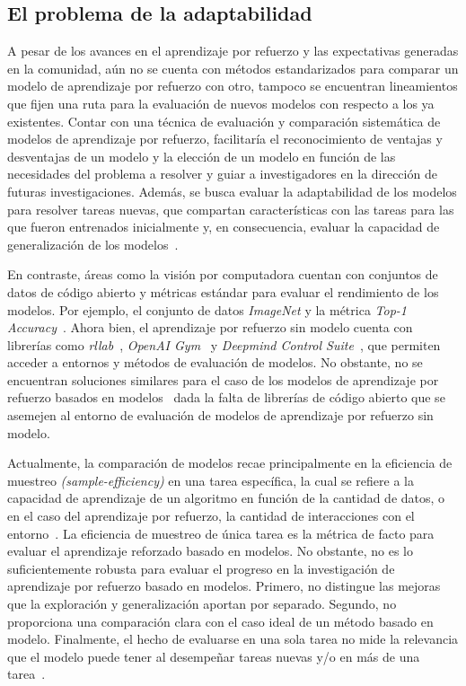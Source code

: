 \subsection{El problema de la adaptabilidad}\label{subsec:el-problema-de-la-adaptabilidad}
A pesar de los avances en el aprendizaje por refuerzo y las expectativas generadas en la comunidad, aún no se cuenta con métodos estandarizados para comparar un modelo de aprendizaje por refuerzo con otro, tampoco se encuentran lineamientos que fijen una ruta para la evaluación de nuevos modelos con respecto a los ya existentes.
Contar con una técnica de evaluación y comparación sistemática de modelos de aprendizaje por refuerzo, facilitaría el reconocimiento de ventajas y desventajas de un modelo y la elección de un modelo en función de las necesidades del problema a resolver y guiar a investigadores en la dirección de futuras investigaciones.
Además, se busca evaluar la adaptabilidad de los modelos para resolver tareas nuevas, que compartan características con las tareas para las que fueron entrenados inicialmente y, en consecuencia, evaluar la capacidad de generalización de los modelos~\cite{YiWan_2022, benchmarking_2019}.

En contraste, áreas como la visión por computadora cuentan con conjuntos de datos de código abierto y métricas estándar para evaluar el rendimiento de los modelos.
Por ejemplo, el conjunto de datos \textit{ImageNet} y la métrica \textit{Top-1 Accuracy}~\cite{imagenet}.
Ahora bien, el aprendizaje por refuerzo sin modelo cuenta con librerías como \textit{rllab}~\cite{rllab}, \textit{OpenAI Gym}~\cite{openai-gym} y \textit{Deepmind Control Suite}~\cite{deepmind-control-suite}, que permiten acceder a entornos y métodos de evaluación de modelos.
No obstante, no se encuentran soluciones similares para el caso de los modelos de aprendizaje por refuerzo basados en modelos~\cite{benchmarking_2019} dada la falta de librerías de código abierto que se asemejen al entorno de evaluación de modelos de aprendizaje por refuerzo sin modelo.

Actualmente, la comparación de modelos recae principalmente en la eficiencia de muestreo \textit{(sample-efficiency)} en una tarea específica, la cual se refiere a la capacidad de aprendizaje de un algoritmo en función de la cantidad de datos, o en el caso del aprendizaje por refuerzo, la cantidad de interacciones con el entorno~\cite{benchmarking_2019}.
La eficiencia de muestreo de única tarea es la métrica de facto para evaluar el aprendizaje reforzado basado en modelos.
No obstante, no es lo suficientemente robusta para evaluar el progreso en la investigación de aprendizaje por refuerzo basado en modelos.
Primero, no distingue las mejoras que la exploración y generalización aportan por separado.
Segundo, no proporciona una comparación clara con el caso ideal de un método basado en modelo.
Finalmente, el hecho de evaluarse en una sola tarea no mide la relevancia que el modelo puede tener al desempeñar tareas nuevas y/o en más de una tarea~\cite{LOCA_2020}.

